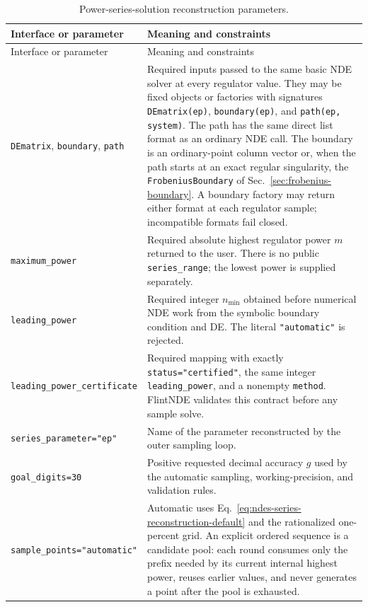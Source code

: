 \documentclass[11pt]{article}
\begin{document}
\small
\begin{longtable}{L{0.36\textwidth}L{0.58\textwidth}}
\caption{Power-series-solution reconstruction parameters.}\label{tab:regulator-api}\\
\toprule
Interface or parameter & Meaning and constraints \\
\midrule
\endfirsthead
\toprule
Interface or parameter & Meaning and constraints \\
\midrule
\endhead
\texttt{DEmatrix}, \texttt{boundary}, \texttt{path} & Required inputs passed to the same
basic NDE solver at every regulator value.  They may be fixed objects or factories with
signatures \texttt{DEmatrix(ep)}, \texttt{boundary(ep)}, and
\texttt{path(ep, system)}.  The path has the same direct list format as an ordinary NDE call.
The boundary is an ordinary-point column vector or, when the path starts at an exact regular
singularity, the \texttt{FrobeniusBoundary} of Sec.~\ref{sec:frobenius-boundary}.  A boundary
factory may return either format at each regulator sample; incompatible formats fail closed. \\
\texttt{maximum\_power} & Required absolute highest regulator power $m$ returned to the user.
There is no public \texttt{series\_range}; the lowest power is supplied separately. \\
\texttt{leading\_power} & Required integer $n_{\min}$ obtained before numerical NDE work from
the symbolic boundary condition and DE.  The literal \texttt{"automatic"} is rejected. \\
\texttt{leading\_power\_}\newline\texttt{certificate} & Required mapping with exactly
\texttt{status="certified"}, the same integer \texttt{leading\_power}, and a nonempty
\texttt{method}.  FlintNDE validates this contract before any sample solve. \\
\texttt{series\_parameter="ep"} & Name of the parameter reconstructed by the outer sampling
loop. \\
\texttt{goal\_digits=30} & Positive requested decimal accuracy $g$ used by the automatic
sampling, working-precision, and validation rules. \\
\texttt{sample\_points="automatic"} & Automatic uses Eq.~\eqref{eq:ndes-series-reconstruction-default}
and the rationalized one-percent grid.  An explicit ordered sequence is a candidate pool:
each round consumes only the prefix needed by its current internal highest power, reuses earlier
values, and never generates a point after the pool is exhausted. \\

\end{longtable}
\end{document}
